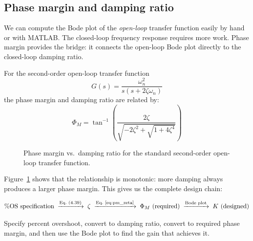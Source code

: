 \documentclass[../../book.tex]{subfiles}
\begin{document}
\subsection{Phase margin and damping ratio}
\label{sec:pm_zeta}

We can compute the Bode plot of the \emph{open-loop} transfer function easily
by hand or with MATLAB\@.  The closed-loop frequency response requires more work.
Phase margin provides the bridge: it connects the open-loop Bode plot directly
to the closed-loop damping ratio.

For the second-order open-loop transfer function
\begin{equation}
  G(s) = \frac{\omega_n^2}{s(s+2\zeta\omega_n)}
  \label{eq:second_order_ol}
\end{equation}
the phase margin and damping ratio are related by:
\begin{equation}
  \boxed{
    \Phi_M = \tan^{-1}\!\left(\frac{2\zeta}{\sqrt{-2\zeta^2+\sqrt{1+4\zeta^4}}}\right)
  }
  \label{eq:pm_zeta}
\end{equation}

\begin{figure}[htbp]
  \caption{Phase margin vs.\ damping ratio for the standard second-order
    open-loop transfer function.}
  \label{fig:pm_zeta}
\end{figure}

Figure~\ref{fig:pm_zeta} shows that the relationship is monotonic: more damping
always produces a larger phase margin.  This gives us the complete design chain:

\begin{equation*}
  \text{\%OS specification}
  \;\xrightarrow{\text{Eq.~(4.39)}}\;
  \zeta
  \;\xrightarrow{\text{Eq.~\eqref{eq:pm_zeta}}}\;
  \Phi_M \text{ (required)}
  \;\xrightarrow{\text{Bode plot}}\;
  K \text{ (designed)}
\end{equation*}

Specify percent overshoot, convert to damping ratio, convert to required phase
margin, and then use the Bode plot to find the gain that achieves it.
\end{document}
